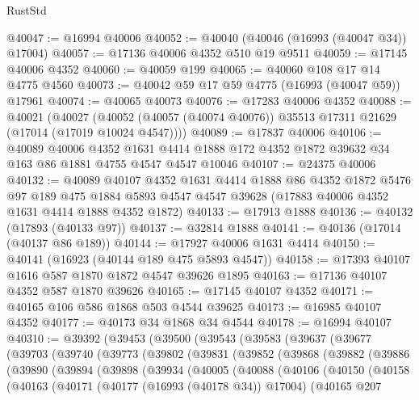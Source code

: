 \begin{lexlean}{RustStd}
\begin{coremodule}
{\begin{coremodule}
{{{{{{{{{{{{{{{{{{{{{{{{{{{{{{{{{{{{{{{{{{{{{{{{{{{{{{{@40047 := @16994 @40006
@40052 := @40040 (@40046 (@16993 (@40047 @34)) @17004)
@40057 := @17136 @40006 @4352 @510 @19 @9511
@40059 := @17145 @40006 @4352
@40060 := @40059 @199
@40065 := @40060 @108 @17 @14 @4775 @4560
@40073 := @40042 @59 @17 @59 @4775 (@16993 (@40047 @59)) @17961
@40074 := @40065 @40073
@40076 := @17283 @40006 @4352
@40088 := @40021
    (@40027 (@40052 (@40057 (@40074 @40076)) @35513 @17311 @21629 (@17014 (@17019 @10024 @4547))))
@40089 := @17837 @40006
@40106 := @40089
    @40006
    @4352
    @1631
    @4414
    @1888
    @172
    @4352
    @1872
    @39632
    @34
    @163
    @86
    @1881
    @4755
    @4547
    @4547
    @10046
@40107 := @24375 @40006
@40132 := @40089
    @40107
    @4352
    @1631
    @4414
    @1888
    @86
    @4352
    @1872
    @5476
    @97
    @189
    @475
    @1884
    @5893
    @4547
    @4547
    @39628
    (@17883 @40006 @4352 @1631 @4414 @1888 @4352 @1872)
@40133 := @17913 @1888
@40136 := @40132 (@17893 (@40133 @97))
@40137 := @32814 @1888
@40141 := @40136 (@17014 (@40137 @86 @189))
@40144 := @17927 @40006 @1631 @4414
@40150 := @40141 (@16923 (@40144 @189 @475 @5893 @4547))
@40158 := @17393 @40107 @1616 @587 @1870 @1872 @4547 @39626 @1895
@40163 := @17136 @40107 @4352 @587 @1870 @39626
@40165 := @17145 @40107 @4352
@40171 := @40165 @106 @586 @1868 @503 @4544 @39625
@40173 := @16985 @40107 @4352
@40177 := @40173 @34 @1868 @34 @4544
@40178 := @16994 @40107
@40310 := @39392
    (@39453
      (@39500
        (@39543
          (@39583
            (@39637
              (@39677
                (@39703
                  (@39740
                    (@39773
                      (@39802
                        (@39831
                          (@39852
                            (@39868
                              (@39882
                                (@39886
                                  (@39890
                                    (@39894
                                      (@39898
                                        (@39934
                                          (@40005
                                            (@40088
                                              (@40106
                                                (@40150
                                                  (@40158
                                                    (@40163
                                                      (@40171
                                                        (@40177 (@16993 (@40178 @34)) @17004)
                                                        (@40165
                                                          @207
}}}}}}}}}}}}}}}}}}}}}}}}}}}}}}}}}}}}}}}}}}}}}}}}}}}}}}}
\end{coremodule}}
\end{coremodule}
\end{lexlean}
